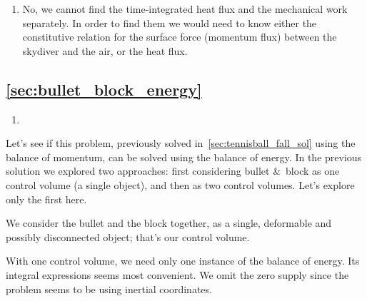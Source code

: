 \documentclass[a4paper,12pt,%
onecolumn,oneside,%
british%
]{memoir}
\newcommand*{\amp}{\&}
\newcommand{\solution}[1]{\subsection*{\makebox[0pt][r]{\faIcon[regular]{lightbulb}\enskip}\ref{#1}}%
\addcontentsline{toc}{subsection}{\ref{#1}}%
\label{#1_sol}%
\marginpar{\vspace{-1\baselineskip}\hspace{-8em}\footnotesize Exercise p.~\pageref{#1}}
}%
\newcommand*{\di}{\mathop{}\!\mathrm{d}}%
\renewcommand*{\|}[1][]{\nonscript\:#1\vert\nonscript\:\mathopen{}}
\newcommand*{\yti}{t_{0}}
\newcommand*{\ytf}{t_{1}}
\newcommand*{\dt}{\di t}
\newcommand*{\ym}{m}%
\newcommand*{\yE}{E}
\newcommand*{\yU}{U}
\newcommand*{\yH}{W}
\begin{document}
\begin{enumerate}[exerc]
Indeed replacing into the first equation all the remaining ones, and then rearranging and simplifying, we find
\begin{equation*}
  \begin{aligned}
    \int_{\yti}^{\ytf}\!\!\yH(t)\dt &=
    \frac{1}{2}\,\ym\, v_{z}(\ytf)^{2} + \ym\, g\, z(\ytf)
    - \frac{1}{2}\,\ym\, v_{z}(\yti)^{2} - \ym\, g\, z(\yti)
    \\
    &= \qty{105875}{J} + \qty{686000}{J}
    - \qty{0}{J} - \qty{2058000}{J}
    \approx -\qty{1300000}{J} \ .
  \end{aligned}
\end{equation*}
This is a negative influx, which means that a net amount of positive energy flows from the skydiver to the surrounding air. This is the effect of friction, which does \emph{negative} work on the skydiver, and heats both skydiver and air.

In the system of equations above, ten equations in eleven unknowns, there must be some quantities that depend on a free variable. Which ones are they? They are $\yE(\ytf)$, $\yE(\yti)$, $\yU(\yti)$, $\yU(\ytf)$. We don't know their values; but once one of them is specified, we can find the remaining three.

\item No, we cannot find the time-integrated heat flux and the mechanical work separately. In order to find them we would need to know either the constitutive relation for the surface force (momentum flux) between the skydiver and the air, or the heat flux.
\end{enumerate}


\solution{sec:bullet_block_energy}

\begin{enumerate}[exerc]
\item 
\end{enumerate}
Let's see if this problem, previously solved in~\ref{sec:tennisball_fall_sol} using the balance of momentum, can be solved using the balance of energy. In the previous solution we explored two approaches: first considering bullet \amp\ block as one control volume (a single object), and then as two control volumes. Let's explore only the first here.

We consider the bullet and the block together, as a single, deformable and possibly disconnected object; that's our control volume.

With one control volume, we need only one instance of the balance of energy. Its integral expressions seems most convenient. We omit the zero supply since the problem seems to be using inertial coordinates.
\end{document}
